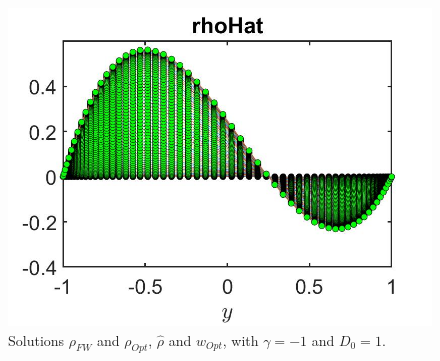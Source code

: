 \documentclass[11pt, a4paper]{article}
\theoremstyle{definition}
\begin{document}
\begin{figure}[h]
	\includegraphics[scale=0.3]{DFrhoHat1.jpg}
	\caption{Solutions $\rho_{FW}$ and $\rho_{Opt}$, $\hat \rho$ and $w_{Opt}$, with $\gamma = -1$ and $D_0 = 1$.}
	\label{rhoDF1}
\end{figure}
\end{document}
